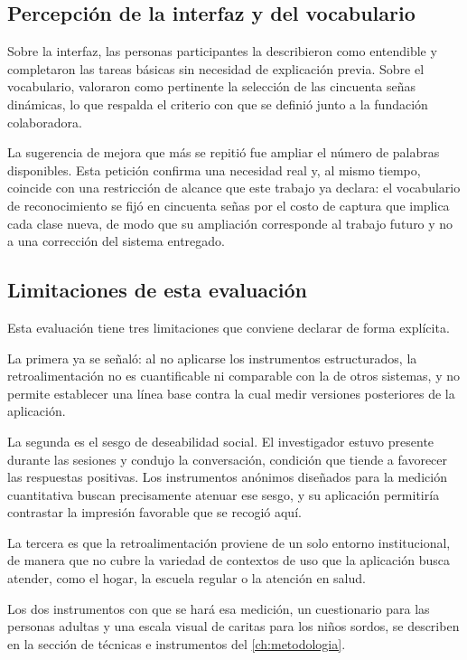 \subsection{Percepción de la interfaz y del vocabulario}

Sobre la interfaz, las personas participantes la describieron como entendible y completaron las tareas básicas sin necesidad de explicación previa. Sobre el vocabulario, valoraron como pertinente la selección de las cincuenta señas dinámicas, lo que respalda el criterio con que se definió junto a la fundación colaboradora.

La sugerencia de mejora que más se repitió fue ampliar el número de palabras disponibles. Esta petición confirma una necesidad real y, al mismo tiempo, coincide con una restricción de alcance que este trabajo ya declara: el vocabulario de reconocimiento se fijó en cincuenta señas por el costo de captura que implica cada clase nueva, de modo que su ampliación corresponde al trabajo futuro y no a una corrección del sistema entregado.

\subsection{Limitaciones de esta evaluación}

Esta evaluación tiene tres limitaciones que conviene declarar de forma explícita.

La primera ya se señaló: al no aplicarse los instrumentos estructurados, la retroalimentación no es cuantificable ni comparable con la de otros sistemas, y no permite establecer una línea base contra la cual medir versiones posteriores de la aplicación.

La segunda es el sesgo de deseabilidad social. El investigador estuvo presente durante las sesiones y condujo la conversación, condición que tiende a favorecer las respuestas positivas. Los instrumentos anónimos diseñados para la medición cuantitativa buscan precisamente atenuar ese sesgo, y su aplicación permitiría contrastar la impresión favorable que se recogió aquí.

La tercera es que la retroalimentación proviene de un solo entorno institucional, de manera que no cubre la variedad de contextos de uso que la aplicación busca atender, como el hogar, la escuela regular o la atención en salud.

Los dos instrumentos con que se hará esa medición, un cuestionario para las personas adultas y una escala visual de caritas para los niños sordos, se describen en la sección de técnicas e instrumentos del \autoref{ch:metodologia}.

